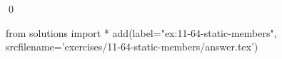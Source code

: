 
\begin{ex}
  \label{ex:11-64-static-members}
  
  \qed
\end{ex}
\begin{python0}
from solutions import *
add(label="ex:11-64-static-members",
    srcfilename='exercises/11-64-static-members/answer.tex')
\end{python0}
